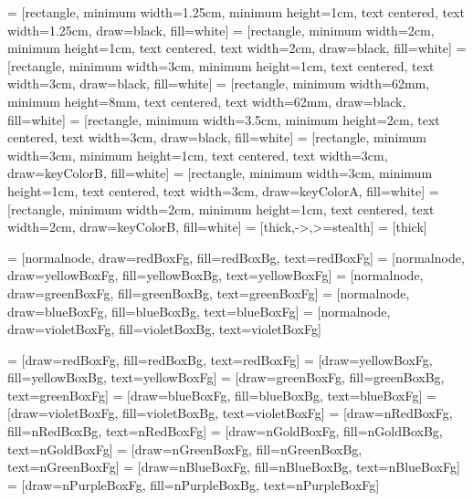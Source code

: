 



 = [rectangle, minimum width=1.25cm, minimum height=1cm, text centered, text width=1.25cm, draw=black, fill=white]
 = [rectangle, minimum width=2cm, minimum height=1cm, text centered, text width=2cm, draw=black, fill=white]
 = [rectangle, minimum width=3cm, minimum height=1cm, text centered, text width=3cm, draw=black, fill=white]
 = [rectangle, minimum width=62mm, minimum height=8mm, text centered, text width=62mm, draw=black, fill=white]
 = [rectangle, minimum width=3.5cm, minimum height=2cm, text centered, text width=3cm, draw=black, fill=white]
 = [rectangle, minimum width=3cm, minimum height=1cm, text centered, text width=3cm, draw=keyColorB, fill=white]
 = [rectangle, minimum width=3cm, minimum height=1cm, text centered, text width=3cm, draw=keyColorA, fill=white]
 = [rectangle, minimum width=2cm, minimum height=1cm, text centered, text width=2cm, draw=keyColorB, fill=white]
 = [thick,->,>=stealth]
 = [thick]

 = [normalnode, draw=redBoxFg, fill=redBoxBg, text=redBoxFg]
 = [normalnode, draw=yellowBoxFg, fill=yellowBoxBg, text=yellowBoxFg]
 = [normalnode, draw=greenBoxFg, fill=greenBoxBg, text=greenBoxFg]
 = [normalnode, draw=blueBoxFg, fill=blueBoxBg, text=blueBoxFg]
 = [normalnode, draw=violetBoxFg, fill=violetBoxBg, text=violetBoxFg]

 = [draw=redBoxFg, fill=redBoxBg, text=redBoxFg]
 = [draw=yellowBoxFg, fill=yellowBoxBg, text=yellowBoxFg]
 = [draw=greenBoxFg, fill=greenBoxBg, text=greenBoxFg]
 = [draw=blueBoxFg, fill=blueBoxBg, text=blueBoxFg]
 = [draw=violetBoxFg, fill=violetBoxBg, text=violetBoxFg]
 = [draw=nRedBoxFg, fill=nRedBoxBg, text=nRedBoxFg]
 = [draw=nGoldBoxFg, fill=nGoldBoxBg, text=nGoldBoxFg]
 = [draw=nGreenBoxFg, fill=nGreenBoxBg, text=nGreenBoxFg]
 = [draw=nBlueBoxFg, fill=nBlueBoxBg, text=nBlueBoxFg]
 = [draw=nPurpleBoxFg, fill=nPurpleBoxBg, text=nPurpleBoxFg]

